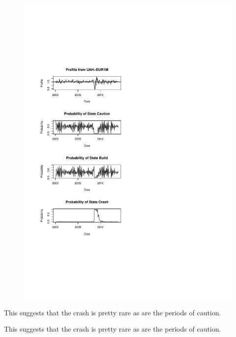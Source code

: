 \documentclass[12pt, a4paper, oneside]{article} %
\begin{document}
\begin{figure}[h!]
\centering
\includegraphics[scale = .80]{../Figures/3RegProb/HRKUAHEUR.pdf}
\end{figure}

This suggests that the crash is pretty rare as are the periods of caution. 


This suggests that the crash is pretty rare as are the periods of caution. 
\end{document}
